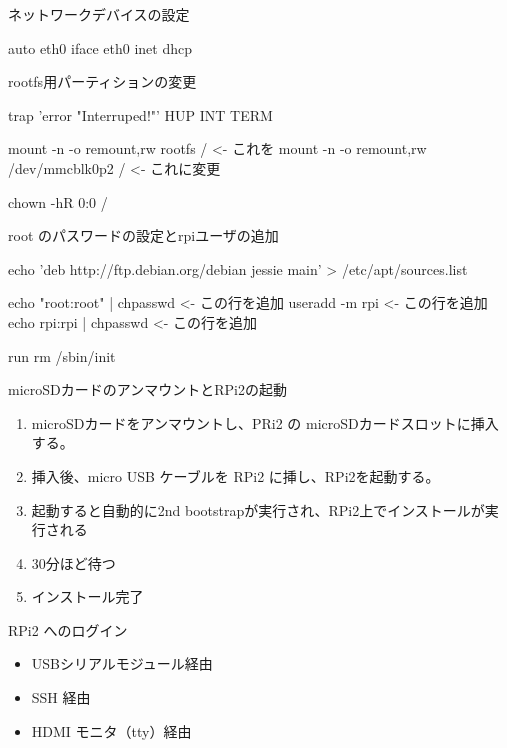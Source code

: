 \begin{frame}[containsverbatim]{ネットワークデバイスの設定}

\begin{commandline}
auto eth0
iface eth0 inet dhcp
\end{commandline}
\end{frame}

\begin{frame}[containsverbatim]{rootfs用パーティションの変更}

\begin{commandline}
trap 'error "Interruped!"' HUP INT TERM

mount -n -o remount,rw rootfs / <- これを
mount -n -o remount,rw /dev/mmcblk0p2 / <- これに変更

chown -hR 0:0 /
\end{commandline}
\end{frame}

\begin{frame}[containsverbatim]{root のパスワードの設定とrpiユーザの追加}
\begin{commandline}
echo 'deb http://ftp.debian.org/debian jessie main' > /etc/apt/sources.list

echo "root:root" | chpasswd <- この行を追加
useradd -m rpi <- この行を追加
echo rpi:rpi | chpasswd <- この行を追加

run rm /sbin/init
\end{commandline}
\end{frame}

\begin{frame}[containsverbatim]{microSDカードのアンマウントとRPi2の起動}

\begin{enumerate}
\item microSDカードをアンマウントし、PRi2 の microSDカードスロットに挿入する。
\item 挿入後、micro USB ケーブルを RPi2 に挿し、RPi2を起動する。
\item 起動すると自動的に2nd bootstrapが実行され、RPi2上でインストールが実行される
\item 30分ほど待つ
\item インストール完了
\end{enumerate}
\end{frame}

\begin{frame}[containsverbatim]{RPi2 へのログイン}

\begin{itemize}
\item USBシリアルモジュール経由
\item SSH 経由
\item HDMI モニタ（tty）経由
\end{itemize}

\end{frame}

